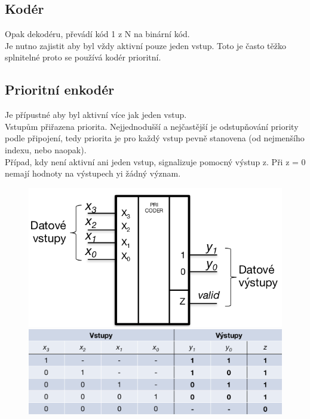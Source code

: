 \subsection{Kodér}
Opak dekodéru, převádí kód 1 z N na binární kód. \\
Je nutno zajistit aby byl vždy aktivní pouze jeden vstup. Toto je často těžko splnitelné proto se používá kodér prioritní.\\

\subsection{Prioritní enkodér}
Je přípustné aby byl aktivní více jak jeden vstup.\\
Vstupům přiřazena priorita. Nejjednodušší a nejčastější je odstupňování priority podle připojení, tedy priorita je pro každý vstup pevně stanovena (od nejmenšího indexu, nebo naopak).\\
Případ, kdy není aktivní ani jeden vstup, signalizuje pomocný výstup z. Při z = 0 nemají hodnoty na výstupech yi žádný význam.\\

\begin{figure}[h!]
    \centering
    \begin{minipage}[b]{0.4\textwidth}
        \includegraphics[width=\textwidth]{img/PrioEn.png}
    \end{minipage}
    \hfill
    \begin{minipage}[b]{0.4\textwidth}
        \includegraphics[width = \textwidth]{img/PriEnTab.png}
    \end{minipage}
\end{figure}

